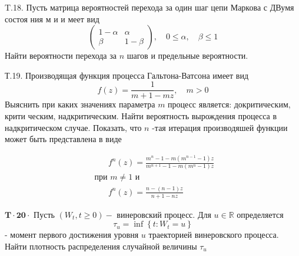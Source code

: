 \documentclass[a4paper,12pt]{article} %
\begin{document}
\begin{example}

T.18. Пусть матрица вероятностей перехода за один шаг цепи Маркова с
ДВумя состоя ния м и и меет вид
$$
\left(\begin{array}{cc}
1-\alpha & \alpha \\
\beta & 1-\beta
\end{array}\right), \quad 0 \leqslant \alpha, \quad \beta \leqslant 1
$$
Найти вероятности перехода за $n$ шагов и предельные вероятности.




\end{example}



\begin{example}

Т.19. Производящая функция процесса Гальтона-Ватсона имеет вид
$$
f(z)=\frac{1}{m+1-m z}, \quad m>0
$$
Выяснить при каких значениях параметра $m$ процесс является: докритическим, крити ческим, надкритическим. Найти вероятность вырождения процесса в надкритическом случае. Показать, что $n$ -тая итерация производяшей функции может быть представлена в виде

\begin{equation}\begin{array}{l}
\qquad f^{n}(z)=\frac{m^{n}-1-m\left(m^{n-1}-1\right) z}{m^{n+1}-1-m\left(m^{n}-1\right) z} \\
\text { при } m \neq 1 \text { и } \\
\qquad f^{n}(z)=\frac{n-(n-1) z}{n+1-n z}
\end{array}\end{equation}


\end{example}





\begin{example}

$\mathbf{T} \cdot \mathbf{2} \mathbf{0} \cdot$ Пусть $\left(W_{t}, t \geq 0\right)-$ винеровский процесс. Для $u \in \mathbb{R}$ определяется
$$
\tau_{u}=\inf \left\{t: W_{t}=u\right\}
$$
- момент первого достижения уровня $u$ траекторией винеровского процесса. Найти плотность распределения случайной величины $\tau_{u}$




\end{example}
\end{document}
